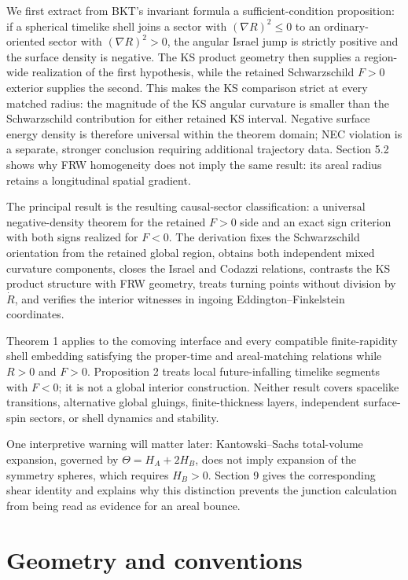 \documentclass[pdflatex,sn-mathphys-num]{sn-jnl}
\begin{document}
We first extract from BKT's invariant formula \cite[p.~2925, Eq.~(2.54a)]{ref2} a sufficient-condition proposition: if a spherical timelike shell joins a sector with \((\nabla R)^2\le0\) to an ordinary-oriented sector with \((\nabla R)^2>0\), the angular Israel jump is strictly positive and the surface density is negative. The KS product geometry then supplies a region-wide realization of the first hypothesis, while the retained Schwarzschild \(F>0\) exterior supplies the second. This makes the KS comparison strict at every matched radius: the magnitude of the KS angular curvature is smaller than the Schwarzschild contribution for either retained KS interval. Negative surface energy density is therefore universal within the theorem domain; NEC violation is a separate, stronger conclusion requiring additional trajectory data. Section 5.2 shows why FRW homogeneity does not imply the same result: its areal radius retains a longitudinal spatial gradient.


The principal result is the resulting causal-sector classification: a universal negative-density theorem for the retained \(F>0\) side and an exact sign criterion with both signs realized for \(F<0\). The derivation fixes the Schwarzschild orientation from the retained global region, obtains both independent mixed curvature components, closes the Israel and Codazzi relations, contrasts the KS product structure with FRW geometry, treats turning points without division by \(\dot R\), and verifies the interior witnesses in ingoing Eddington--Finkelstein coordinates.


Theorem 1 applies to the comoving interface and every compatible finite-rapidity shell embedding satisfying the proper-time and areal-matching relations while \(R>0\) and \(F>0\). Proposition 2 treats local future-infalling timelike segments with \(F<0\); it is not a global interior construction. Neither result covers spacelike transitions, alternative global gluings, finite-thickness layers, independent surface-spin sectors, or shell dynamics and stability.


One interpretive warning will matter later: Kantowski--Sachs total-volume expansion, governed by \(\Theta=H_A+2H_B\), does not imply expansion of the symmetry spheres, which requires \(H_B>0\). Section 9 gives the corresponding shear identity and explains why this distinction prevents the junction calculation from being read as evidence for an areal bounce.


\section{Geometry and conventions}
\end{document}
